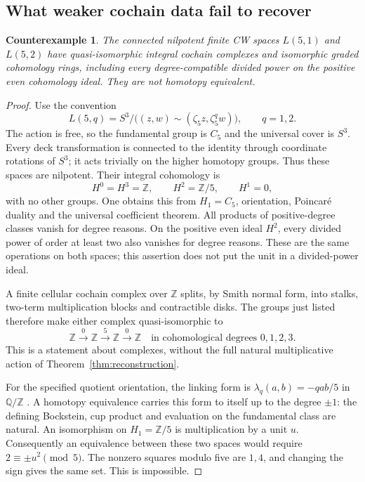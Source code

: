 \documentclass[11pt,a4paper]{article}
\newtheorem{counterexample}[theorem]{Counterexample}
\theoremstyle{definition}
\newcommand{\Z}{\mathbb Z}
\newcommand{\Q}{\mathbb Q}
\begin{document}
\subsection{What weaker cochain data fail to recover}
\begin{counterexample}\label{ex:lens}
The connected nilpotent finite CW spaces $L(5,1)$ and $L(5,2)$ have
quasi-isomorphic integral cochain complexes and isomorphic graded
cohomology rings, including every degree-compatible divided power on
the positive even cohomology ideal. They are not homotopy equivalent.
\end{counterexample}
\begin{proof}
Use the convention
\[
 L(5,q)=S^3/\bigl((z,w)\sim(\zeta_5z,\zeta_5^qw)\bigr),
 \qquad q=1,2.
\]
The action is free, so the fundamental group is $C_5$ and the
universal cover is $S^3$. Every deck transformation is connected to
the identity through coordinate rotations of $S^3$; it acts trivially
on the higher homotopy groups. Thus these spaces are nilpotent.
Their integral cohomology is
\[
 H^0=H^3=\Z,\qquad H^2=\Z/5,\qquad H^1=0,
\]
with no other groups. One obtains this from $H_1=C_5$, orientation,
Poincar\'e duality and the universal coefficient theorem. All products
of positive-degree classes vanish for degree reasons. On the positive
even ideal $H^2$, every divided power of order at least two also
vanishes for degree reasons. These are the same operations on both
spaces; this assertion does not put the unit in a divided-power ideal.

A finite cellular cochain complex over $\Z$ splits, by Smith normal
form, into stalks, two-term multiplication blocks and contractible
disks. The groups just listed therefore make either complex
quasi-isomorphic to
\[
 \Z\xrightarrow{0}\Z\xrightarrow{5}\Z\xrightarrow{0}\Z
 \quad\text{in cohomological degrees }0,1,2,3.
\]
This is a statement about complexes, without the full natural
multiplicative action of Theorem~\ref{thm:reconstruction}.

For the specified quotient orientation, the linking form is
$\lambda_q(a,b)=-qab/5$ in $\Q/\Z$
\cite[Proposition~1.2, p.~2]{CFH}. A homotopy equivalence carries
this form to itself up to the degree $\pm1$: the defining Bockstein,
cup product and evaluation on the fundamental class are natural.
An isomorphism on $H_1=\Z/5$ is multiplication by a unit $u$.
Consequently an equivalence between these two spaces would require
$2\equiv\pm u^2\pmod5$. The nonzero squares modulo five are
$1,4$, and changing the sign gives the same set. This is impossible.
\end{proof}
\end{document}
